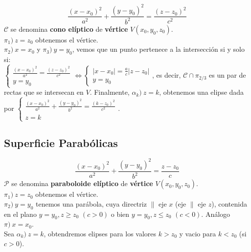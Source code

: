 \documentclass[11pt,a4paper]{article}
\begin{document}
\newpage
$$\frac{(x-x_0)^2}{a^2} + \frac{(y-y_0)^2}{b^2} = \frac{(z-z_0)^2}{c^2}$$
$\mathcal{C}$ se denomina \textbf{cono el\'iptico} de \textbf{v\'ertice} $V(x_0, y_0, z_0)$.\\
$\pi_1)\ z = z_0$ obtenemos el v\'ertice.\\
$\pi_2)\ x = x_0$ y $\pi_3)\ y = y_0$, vemos que un punto pertenece a la intersecci\'on si y solo si:\\
$\left\{ \begin{array}{l} \frac{(x-x_0)^2}{a^2} = \frac{(z-z_0)^2}{c^2} \\ y = y_0 \end{array} \right. \iff
\left\{ \begin{array}{l} |x - x_0| = \frac{a}{c} |z - z_0| \\ y = y_0 \end{array} \right.$, es decir, $\mathcal{C} \cap \pi_{2/3}$ es un par de rectas que se intersecan en $V$. Finalmente, $\alpha_k)\ z = k$, obtenemos una elipse dada por 
$\left\{ \begin{array}{l} \frac{(x-x_0)^2}{a^2} + \frac{(y-y_0)^2}{b^2} = \frac{(k-z_0)^2}{c^2} \\ z = k \end{array} \right.$.

\subsection{Superficie Parab\'olicas}
$$\frac{(x-x_0)^2}{a^2} + \frac{(y-y_0)^2}{b^2} = \frac{z-z_0}{c}$$
$\mathcal{P}$ se denomina \textbf{paraboloide el\'iptico} de \textbf{v\'ertice} $V(x_0, y_0, z_0)$.\\
$\pi_1)\ z = z_0$ obtenemos el v\'ertice.\\
$\pi_2)\ y = y_0$ tenemos una par\'abola, cuya directriz $\parallel$ eje $x$ (eje $\parallel$ eje $z$), contenida en el plano $y=y_0, z \geq z_0$ $(c > 0)$ o bien $y=y_0, z \leq z_0$ $(c < 0)$. An\'alogo $\pi)\ x=x_0$.\\
Sea $\alpha_k)\ z=k$, obtendremos elipses para los valores $k > z_0$ y vacio para $k < z_0$ (si $c>0$).
\end{document}
